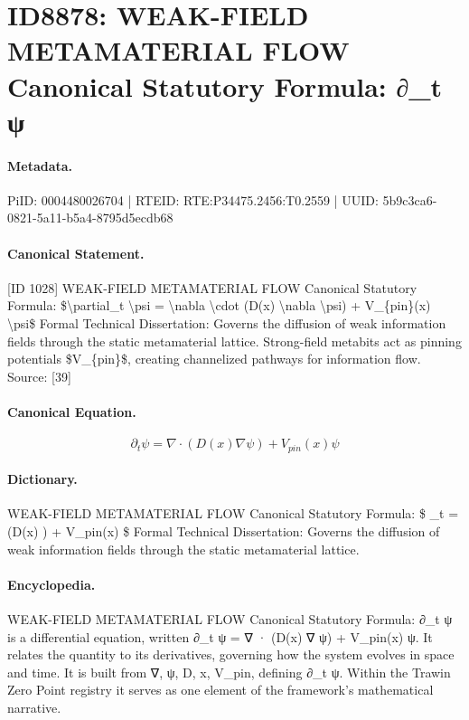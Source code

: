 \section*{ID8878: WEAK-FIELD METAMATERIAL FLOW Canonical Statutory Formula: ∂\_t ψ}
\paragraph{Metadata.}
PiID: 0004480026704 | RTEID: RTE:P34475.2456:T0.2559 | UUID: 5b9c3ca6-0821-5a11-b5a4-8795d5ecdb68

\paragraph{Canonical Statement.}
[ID 1028] WEAK-FIELD METAMATERIAL FLOW Canonical Statutory Formula: \$\textbackslash{}partial\_t \textbackslash{}psi = \textbackslash{}nabla \textbackslash{}cdot (D(x) \textbackslash{}nabla \textbackslash{}psi) + V\_\{pin\}(x) \textbackslash{}psi\$ Formal Technical Dissertation: Governs the diffusion of weak information fields through the static metamaterial lattice. Strong-field metabits act as pinning potentials \$V\_\{pin\}\$, creating channelized pathways for information flow. Source: [39]

\paragraph{Canonical Equation.}
\[
\partial_t \psi = \nabla \cdot (D(x) \nabla \psi) + V_{pin}(x) \psi
\]

\paragraph{Dictionary.}
WEAK-FIELD METAMATERIAL FLOW Canonical Statutory Formula: \$ \_t = (D(x) ) + V\_pin(x) \$ Formal Technical Dissertation: Governs the diffusion of weak information fields through the static metamaterial lattice.

\paragraph{Encyclopedia.}
WEAK-FIELD METAMATERIAL FLOW Canonical Statutory Formula: ∂\_t ψ is a differential equation, written ∂\_t ψ = ∇ · (D(x) ∇ ψ) + V\_pin(x) ψ. It relates the quantity to its derivatives, governing how the system evolves in space and time. It is built from ∇, ψ, D, x, V\_pin, defining ∂\_t ψ. Within the Trawin Zero Point registry it serves as one element of the framework's mathematical narrative.
